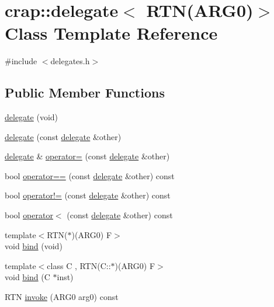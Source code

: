 \hypertarget{classcrap_1_1delegate_3_01_r_t_n_07_a_r_g0_08_4}{}\section{crap\+:\+:delegate$<$ R\+T\+N(A\+R\+G0)$>$ Class Template Reference}
\label{classcrap_1_1delegate_3_01_r_t_n_07_a_r_g0_08_4}


{\ttfamily \#include $<$delegates.\+h$>$}

\subsection*{Public Member Functions}
\begin{DoxyCompactItemize}
\item 
\hyperlink{classcrap_1_1delegate_3_01_r_t_n_07_a_r_g0_08_4_ad3e8ec6a20b2a4149c5f8a75834c47e7}{delegate} (void)
\item 
\hyperlink{classcrap_1_1delegate_3_01_r_t_n_07_a_r_g0_08_4_aafb1633be45285d6e4e656ecd6488a23}{delegate} (const \hyperlink{classcrap_1_1delegate}{delegate} \&other)
\item 
\hyperlink{classcrap_1_1delegate}{delegate} \& \hyperlink{classcrap_1_1delegate_3_01_r_t_n_07_a_r_g0_08_4_a2720d3057c774df322d57d2ad457cad8}{operator=} (const \hyperlink{classcrap_1_1delegate}{delegate} \&other)
\item 
bool \hyperlink{classcrap_1_1delegate_3_01_r_t_n_07_a_r_g0_08_4_afa3d9f7dc73efa0e50cdd68862020476}{operator==} (const \hyperlink{classcrap_1_1delegate}{delegate} \&other) const 
\item 
bool \hyperlink{classcrap_1_1delegate_3_01_r_t_n_07_a_r_g0_08_4_af798daf38e5abe3607313ddefc067954}{operator!=} (const \hyperlink{classcrap_1_1delegate}{delegate} \&other) const 
\item 
bool \hyperlink{classcrap_1_1delegate_3_01_r_t_n_07_a_r_g0_08_4_a7c0c1a3ce5d714e6a6a81dfeb8eb5a02}{operator$<$} (const \hyperlink{classcrap_1_1delegate}{delegate} \&other) const 
\item 
{\footnotesize template$<$R\+T\+N($\ast$)(\+A\+R\+G0) F$>$ }\\void \hyperlink{classcrap_1_1delegate_3_01_r_t_n_07_a_r_g0_08_4_a2f67a292d2724475d8c321b81ab00b01}{bind} (void)
\item 
{\footnotesize template$<$class C , R\+T\+N(\+C\+::$\ast$)(\+A\+R\+G0) F$>$ }\\void \hyperlink{classcrap_1_1delegate_3_01_r_t_n_07_a_r_g0_08_4_ad765fdfdf999e6d543e9361b1d534e8f}{bind} (C $\ast$inst)
\item 
R\+T\+N \hyperlink{classcrap_1_1delegate_3_01_r_t_n_07_a_r_g0_08_4_a0732d5ea7504ad9427bdde563fa2b1ea}{invoke} (A\+R\+G0 arg0) const 
\end{DoxyCompactItemize}


